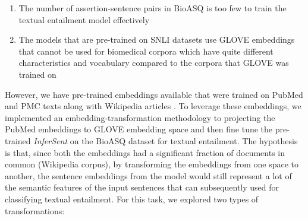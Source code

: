 \documentclass[11pt,a4paper]{article}
\begin{document}
\begin{enumerate}
    \item The number of assertion-sentence pairs in BioASQ is too few to train the textual entailment model effectively
    \item The models that are pre-trained on SNLI \cite{snli}
    datasets use GLOVE \cite{glove} embeddings that cannot be used for biomedical corpora which have quite different characteristics and vocabulary compared to the corpora that GLOVE was trained on
\end{enumerate}

However, we have pre-trained embeddings available that were trained on PubMed and PMC texts along with Wikipedia articles \cite{biomed_embed}. To leverage these embeddings, we implemented an embedding-transformation methodology to projecting the PubMed embeddings to GLOVE embedding space and then fine tune the pre-trained \textit{InferSent} on the BioASQ dataset for textual entailment. The hypothesis is that, since both the embeddings had a significant fraction of documents in common (Wikipedia corpus), by transforming the embeddings from one space to another, the sentence embeddings from the model would still represent a lot of the semantic features of the input sentences that can subsequently used for classifying textual entailment. For this task, we explored two types of transformations:
\end{document}
